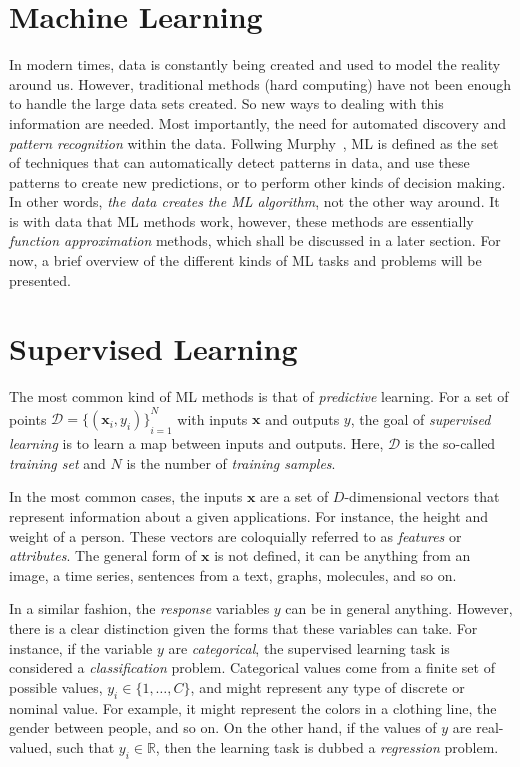 \section{Machine Learning}
In modern times, data is constantly being created and used to model the reality around us.
However, traditional methods (hard computing) have not been enough to handle the large
data sets created. So new ways to dealing with this information are needed. Most 
importantly, the need for automated discovery and \emph{pattern recognition} within the
data. Follwing Murphy~\cite{murphyMachineLearningProbabilistic2012}, ML is defined
as the set of techniques that can automatically detect patterns in data, and use these
patterns to create new predictions, or to perform other kinds of decision making.
In other words, \emph{the data creates the ML algorithm}, not the other way around.
It is with data that ML methods work, however, these methods are essentially
\emph{function approximation} methods, which shall be discussed in a later section.
For now, a brief overview of the different kinds of ML tasks and problems will be presented.

\section{Supervised Learning}
The most common kind of ML methods is that of \emph{predictive} learning. For a set of
points $\mathcal{D}={ \{(\mathbf{x}_{i}, y_i)\} }_{i=1}^{N}$ with inputs $\mathbf{x}$
and outputs $y$, the goal of \emph{supervised learning} is to learn a map between
inputs and outputs. Here, $\mathcal{D}$ is the so-called \emph{training set} and $N$
is the number of \emph{training samples}.

In the most common cases, the inputs $\mathbf{x}$ are a set of $D$-dimensional vectors that
represent information about a given applications. For instance, the height and weight of a
person. These vectors are coloquially referred to as \emph{features} or \emph{attributes}.
The general form of $\mathbf{x}$ is not defined, it can be anything from an image, a time 
series, sentences from a text, graphs, molecules, and so on.

In a similar fashion, the \emph{response} variables $y$ can be in general anything. However,
there is a clear distinction given the forms that these variables can take. For instance,
if the variable $y$ are \emph{categorical}, the supervised learning task is considered
a \emph{classification} problem. Categorical values come from a finite set of possible 
values, $y_{i} \in \{1, \dots, C\}$, and might represent any type of discrete or nominal
value. For example, it might represent the colors in a clothing line, the gender between
people, and so on. On the other hand, if the values of $y$ are real-valued, such that 
$y_{i} \in \mathbb{R}$, then the learning task is dubbed a \emph{regression} problem.

